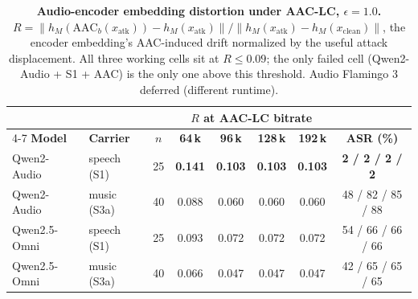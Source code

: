 \begin{table}[H]
\centering
\scriptsize
\setlength{\tabcolsep}{4pt}
\caption{\textbf{Audio-encoder embedding distortion under AAC-LC, $\epsilon{=}1.0$.} $R = \lVert h_M(\mathrm{AAC}_b(x_{\mathrm{atk}})) - h_M(x_{\mathrm{atk}}) \rVert / \lVert h_M(x_{\mathrm{atk}}) - h_M(x_{\mathrm{clean}}) \rVert$, the encoder embedding's AAC-induced drift normalized by the useful attack displacement. All three working cells sit at $R\!\le\!0.09$; the only failed cell (Qwen2-Audio + S1 + AAC) is the only one above this threshold. Audio Flamingo 3 deferred (different runtime).}
\label{tab:enc_residual_aac}
\begin{tabular}{llcccccc}
\toprule
 & & & \multicolumn{4}{c}{\textbf{$R$ at AAC-LC bitrate}} & \\
\cmidrule(lr){4-7}
\textbf{Model} & \textbf{Carrier} & \textbf{$n$} & \textbf{64\,k} & \textbf{96\,k} & \textbf{128\,k} & \textbf{192\,k} & \textbf{ASR (\%)} \\
\midrule
Qwen2-Audio & speech (S1) & 25 & \textbf{0.141} & \textbf{0.103} & \textbf{0.103} & \textbf{0.103} & \textbf{2 / 2 / 2 / 2} \\
Qwen2-Audio & music (S3a) & 40 & 0.088 & 0.060 & 0.060 & 0.060 & 48 / 82 / 85 / 88 \\
Qwen2.5-Omni & speech (S1) & 25 & 0.093 & 0.072 & 0.072 & 0.072 & 54 / 66 / 66 / 66 \\
Qwen2.5-Omni & music (S3a) & 40 & 0.066 & 0.047 & 0.047 & 0.047 & 42 / 65 / 65 / 65 \\
\bottomrule
\end{tabular}
\end{table}
